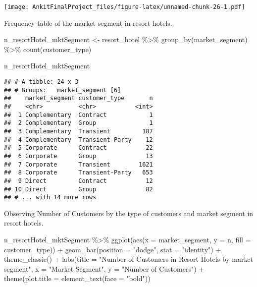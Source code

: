 \documentclass[
]{article}
\newenvironment{Shaded}{\begin{snugshade}}{\end{snugshade}}
\newcommand{\AttributeTok}[1]{\textcolor[rgb]{0.77,0.63,0.00}{#1}}
\newcommand{\FunctionTok}[1]{\textcolor[rgb]{0.00,0.00,0.00}{#1}}
\newcommand{\NormalTok}[1]{#1}
\newcommand{\OtherTok}[1]{\textcolor[rgb]{0.56,0.35,0.01}{#1}}
\newcommand{\SpecialCharTok}[1]{\textcolor[rgb]{0.00,0.00,0.00}{#1}}
\newcommand{\StringTok}[1]{\textcolor[rgb]{0.31,0.60,0.02}{#1}}
\begin{document}
\texttt{[image: AnkitFinalProject\_files/figure-latex/unnamed-chunk-26-1.pdf]}

Frequency table of the market segment in resort hotels.

\begin{Shaded}
\begin{Highlighting}[]
\NormalTok{n\_resortHotel\_mktSegment }\OtherTok{\textless{}{-}}\NormalTok{ resort\_hotel }\SpecialCharTok{\%\textgreater{}\%}
  \FunctionTok{group\_by}\NormalTok{(market\_segment) }\SpecialCharTok{\%\textgreater{}\%} \FunctionTok{count}\NormalTok{(customer\_type)}

\NormalTok{n\_resortHotel\_mktSegment}
\end{Highlighting}
\end{Shaded}

\begin{verbatim}
## # A tibble: 24 x 3
## # Groups:   market_segment [6]
##    market_segment customer_type       n
##    <chr>          <chr>           <int>
##  1 Complementary  Contract            1
##  2 Complementary  Group               1
##  3 Complementary  Transient         187
##  4 Complementary  Transient-Party    12
##  5 Corporate      Contract           22
##  6 Corporate      Group              13
##  7 Corporate      Transient        1621
##  8 Corporate      Transient-Party   653
##  9 Direct         Contract           12
## 10 Direct         Group              82
## # ... with 14 more rows
\end{verbatim}

Observing Number of Customers by the type of customers and market
segment in resort hotels.

\begin{Shaded}
\begin{Highlighting}[]
\NormalTok{n\_resortHotel\_mktSegment }\SpecialCharTok{\%\textgreater{}\%} 
\FunctionTok{ggplot}\NormalTok{(}\FunctionTok{aes}\NormalTok{(}\AttributeTok{x =}\NormalTok{ market\_segment, }\AttributeTok{y =}\NormalTok{ n, }\AttributeTok{fill =}\NormalTok{ customer\_type)) }\SpecialCharTok{+}
  \FunctionTok{geom\_bar}\NormalTok{(}\AttributeTok{position =} \StringTok{"dodge"}\NormalTok{, }\AttributeTok{stat =} \StringTok{"identity"}\NormalTok{) }\SpecialCharTok{+}
  \FunctionTok{theme\_classic}\NormalTok{() }\SpecialCharTok{+}
  \FunctionTok{labs}\NormalTok{(}\AttributeTok{title =} \StringTok{"Number of Customers in Resort Hotels by market segment"}\NormalTok{, }\AttributeTok{x =} \StringTok{"Market Segment"}\NormalTok{, }\AttributeTok{y =} \StringTok{"Number of Customers"}\NormalTok{) }\SpecialCharTok{+}
  \FunctionTok{theme}\NormalTok{(}\AttributeTok{plot.title =} \FunctionTok{element\_text}\NormalTok{(}\AttributeTok{face =} \StringTok{"bold"}\NormalTok{))}
\end{Highlighting}
\end{Shaded}
\end{document}
